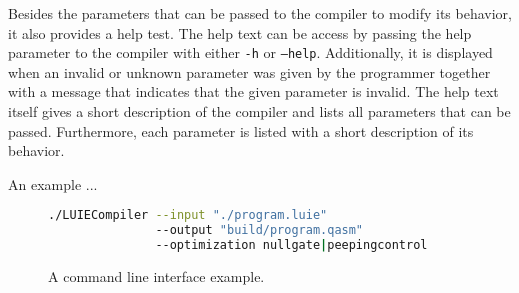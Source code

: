 Besides the parameters that can be passed to the compiler to modify its behavior, it also provides a help test. The help text can be access by passing the help parameter to the compiler with either \texttt{-h} or \texttt{--help}. Additionally, it is displayed when an invalid or unknown parameter was given by the programmer together with a message that indicates that the given parameter is invalid. The help text itself gives a short description of the compiler and lists all parameters that can be passed. Furthermore, each parameter is listed with a short description of its behavior.

An example ...
\begin{figure}[htp]
    \centering
    \begin{lstlisting}[language=bash, style=bashstyle]
./LUIECompiler --input "./program.luie" 
               --output "build/program.qasm" 
               --optimization nullgate|peepingcontrol
    \end{lstlisting}
    \caption{A command line interface example.}
    \label{fig:concept_cli_example}
\end{figure}
